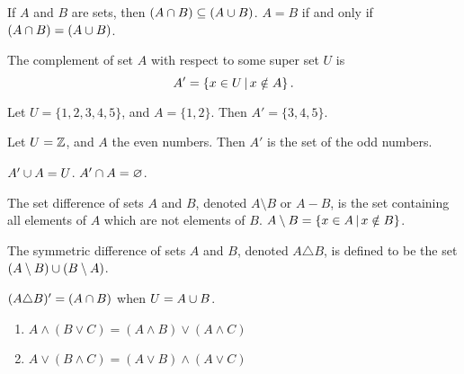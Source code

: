 \begin{rmk}
    If $A$ and $B$ are sets, then $(A \cap B) \subseteq (A \cup B)$. $A = B$ if and only if $(A \cap B) = (A \cup B)$.
\end{rmk}

\begin{defn}
    The complement of set $A$ with respect to some super set $U$ is
    \[A' = \left\{x \in U \,\middle|\, x \notin A\right\}.\]
\end{defn}

\begin{exmp}
    Let $U = \{1, 2, 3, 4, 5\}$, and $A = \{1, 2\}$. Then $A' = \{3, 4, 5\}$.
\end{exmp}

\begin{exmp}
    Let $U = \mathbb{Z}$, and $A$ the even numbers. Then $A'$ is the set of the odd numbers.
\end{exmp}

\begin{rmk}
    $A' \cup A = U$. $A' \cap A = \varnothing$.
\end{rmk}

\begin{defn}\label{set-difference}
    The set difference of sets $A$ and  $B$, denoted $A \setminus B$ or $A - B$, is the set containing all elements of $A$ which are not elements of $B$. $A \setminus B = \left\{x \in A \,\middle|\, x \notin B\right\}$.
\end{defn}

\begin{defn}\label{symmetric-difference}
    The symmetric difference of sets $A$ and $B$, denoted $A \triangle B$, is defined to be the set $(A \setminus B) \cup (B \setminus A)$.
\end{defn}

\begin{rmk}
    $(A \triangle B)' = (A \cap B)$ when $U = A \cup B$.
\end{rmk}

\begin{thm}\label{set-distributive-rule}\proofbreak
    \begin{enumerate}
        \item $A \land (B \lor C) = (A \land B) \lor (A \land C)$
        \item $A \lor (B \land C) = (A \lor B) \land (A \lor C)$
    \end{enumerate}
\end{thm}

